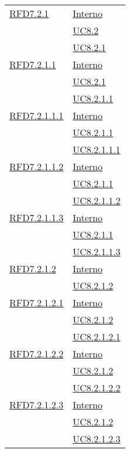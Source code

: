 \begin{longtable}{|>{\centering}m{5cm}|m{5cm}<{\centering}|}
\hyperlink{RFD7.2.1}{RFD7.2.1} & \hyperlink{Interno}{Interno}\\
& \hyperref[UC8.2]{UC8.2}\\
& \hyperref[UC8.2.1]{UC8.2.1}\\ \hline

\hyperlink{RFD7.2.1.1}{RFD7.2.1.1} & \hyperlink{Interno}{Interno}\\
& \hyperref[UC8.2.1]{UC8.2.1}\\
& \hyperref[UC8.2.1.1]{UC8.2.1.1}\\ \hline

\hyperlink{RFD7.2.1.1.1}{RFD7.2.1.1.1} & \hyperlink{Interno}{Interno}\\
& \hyperref[UC8.2.1.1]{UC8.2.1.1}\\
& \hyperref[UC8.2.1.1.1]{UC8.2.1.1.1}\\ \hline

\hyperlink{RFD7.2.1.1.2}{RFD7.2.1.1.2} & \hyperlink{Interno}{Interno}\\
& \hyperref[UC8.2.1.1]{UC8.2.1.1}\\
& \hyperref[UC8.2.1.1.2]{UC8.2.1.1.2}\\ \hline

\hyperlink{RFD7.2.1.1.3}{RFD7.2.1.1.3} & \hyperlink{Interno}{Interno}\\
& \hyperref[UC8.2.1.1]{UC8.2.1.1}\\
& \hyperref[UC8.2.1.1.3]{UC8.2.1.1.3}\\ \hline

\hyperlink{RFD7.2.1.2}{RFD7.2.1.2} & \hyperlink{Interno}{Interno}\\
& \hyperref[UC8.2.1.2]{UC8.2.1.2}\\ \hline

\hyperlink{RFD7.2.1.2.1}{RFD7.2.1.2.1} & \hyperlink{Interno}{Interno}\\
& \hyperref[UC8.2.1.2]{UC8.2.1.2}\\
& \hyperref[UC8.2.1.2.1]{UC8.2.1.2.1}\\ \hline

\hyperlink{RFD7.2.1.2.2}{RFD7.2.1.2.2} & \hyperlink{Interno}{Interno}\\
& \hyperref[UC8.2.1.2]{UC8.2.1.2}\\
& \hyperref[UC8.2.1.2.2]{UC8.2.1.2.2}\\ \hline

\hyperlink{RFD7.2.1.2.3}{RFD7.2.1.2.3} & \hyperlink{Interno}{Interno}\\
& \hyperref[UC8.2.1.2]{UC8.2.1.2}\\
& \hyperref[UC8.2.1.2.3]{UC8.2.1.2.3}\\ \hline


\end{longtable}
